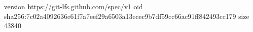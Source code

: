 version https://git-lfs.github.com/spec/v1
oid sha256:7c02a4092636e61f7a7eef29a6503a13ecec9b7df59cc66ac91ff842493cc179
size 43840
